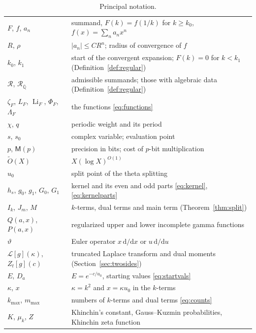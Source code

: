 \documentclass[11pt,reqno]{amsart}
\theoremstyle{definition}
\theoremstyle{remark}
\newcommand{\Li}{\operatorname{Li}}
\newcommand{\Qbar}{\overline{\mathbb{Q}}}
\newcommand{\Reg}{\mathcal{R}}
\newcommand{\RegQ}{\mathcal{R}_{\Qbar}}
\newcommand{\Mul}{\mathsf{M}}
\begin{document}
\begin{table}[ht]
\centering\small
\caption{Principal notation.}
\label{tab:notation}
\begin{tabular}{@{}lp{}@{}}
\toprule
$F$, $f$, $a_n$ & summand, $F(k) = f(1/k)$ for $k \ge k_0$, $f(x) = \sum_na_nx^n$ \\
$R$, $\rho$ & $|a_n| \le CR^n$; radius of convergence of $f$ \\
$k_0$, $k_1$ & start of the convergent expansion; $F(k) = 0$ for $k < k_1$ (Definition~\ref{def:regular}) \\
$\Reg$, $\RegQ$ & admissible summands; those with algebraic data (Definition~\ref{def:regular}) \\
$\zeta_F$, $L_F$, $\Li_F$, $\Phi_F$, $\Lambda_F$ & the functions \eqref{eq:functions} \\
$\chi$, $q$ & periodic weight and its period \\
$s$, $s_0$ & complex variable; evaluation point \\
$p$, $\Mul(p)$ & precision in bits; cost of $p$-bit multiplication \\
$\widetilde O(X)$ & $X(\log X)^{O(1)}$ \\
$u_0$ & split point of the theta splitting \\
$h_s$, $g_0$, $g_1$, $G_0$, $G_1$ & kernel and its even and odd parts \eqref{eq:kernel}, \eqref{eq:kernelparts} \\
$I_k$, $J_m$, $M$ & $k$-terms, dual terms and main term (Theorem~\ref{thm:split}) \\
$Q(a,x)$, $P(a,x)$ & regularized upper and lower incomplete gamma functions \\
$\vartheta$ & Euler operator $x\,\mathrm d/\mathrm dx$ or $u\,\mathrm d/\mathrm du$ \\
$\mathcal L[g](\kappa)$, $Z_t[g](c)$ & truncated Laplace transform and dual moments (Section~\ref{sec:twosides}) \\
$E$, $D_a$ & $E = e^{-c/u_0}$, starting values \eqref{eq:startvals} \\
$\kappa$, $x$ & $\kappa = k^2$ and $x = \kappa u_0$ in the $k$-terms \\
$k_{\max}$, $m_{\max}$ & numbers of $k$-terms and dual terms \eqref{eq:counts} \\
$K$, $\mu_k$, $Z$ & Khinchin's constant, Gauss--Kuzmin probabilities, Khinchin zeta function \\
\bottomrule
\end{tabular}
\end{table}
\end{document}
